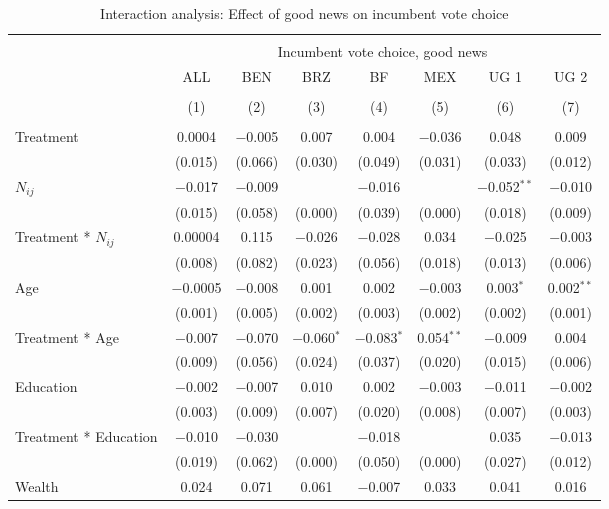 \documentclass[]{article}
\begin{document}
\begin{table}[!htbp] \centering 
  \caption{Interaction analysis: Effect of good news on incumbent vote choice} 
  \label{Interaction_good} 
\begin{tabular}{@{\extracolsep{1pt}}lccccccc} 
\\[-1.8ex]\hline 
\hline \\[-1.8ex] 
 & \multicolumn{7}{c}{Incumbent vote choice, good news} \\ 
\cline{2-8} 
 & ALL & BEN & BRZ & BF & MEX & UG 1 & UG 2 \\ 
\\[-1.8ex] & (1) & (2) & (3) & (4) & (5) & (6) & (7)\\ 
\hline \\[-1.8ex] 
 Treatment & 0.0004 & $-$0.005 & 0.007 & 0.004 & $-$0.036 & 0.048 & 0.009 \\ 
  & (0.015) & (0.066) & (0.030) & (0.049) & (0.031) & (0.033) & (0.012) \\ 
  $N_{ij}$ & $-$0.017 & $-$0.009 &  & $-$0.016 &  & $-$0.052$^{**}$ & $-$0.010 \\ 
  & (0.015) & (0.058) & (0.000) & (0.039) & (0.000) & (0.018) & (0.009) \\ 
  Treatment * $N_{ij}$ & 0.00004 & 0.115 & $-$0.026 & $-$0.028 & 0.034 & $-$0.025 & $-$0.003 \\ 
  & (0.008) & (0.082) & (0.023) & (0.056) & (0.018) & (0.013) & (0.006) \\ 
  Age & $-$0.0005 & $-$0.008 & 0.001 & 0.002 & $-$0.003 & 0.003$^{*}$ & 0.002$^{**}$ \\ 
  & (0.001) & (0.005) & (0.002) & (0.003) & (0.002) & (0.002) & (0.001) \\ 
  Treatment * Age & $-$0.007 & $-$0.070 & $-$0.060$^{*}$ & $-$0.083$^{*}$ & 0.054$^{**}$ & $-$0.009 & 0.004 \\ 
  & (0.009) & (0.056) & (0.024) & (0.037) & (0.020) & (0.015) & (0.006) \\ 
  Education & $-$0.002 & $-$0.007 & 0.010 & 0.002 & $-$0.003 & $-$0.011 & $-$0.002 \\ 
  & (0.003) & (0.009) & (0.007) & (0.020) & (0.008) & (0.007) & (0.003) \\ 
  Treatment * Education & $-$0.010 & $-$0.030 &  & $-$0.018 &  & 0.035 & $-$0.013 \\ 
  & (0.019) & (0.062) & (0.000) & (0.050) & (0.000) & (0.027) & (0.012) \\ 
  Wealth & 0.024 & 0.071 & 0.061 & $-$0.007 & 0.033 & 0.041 & 0.016 \\ 

\end{tabular}
\end{table}
\end{document}
